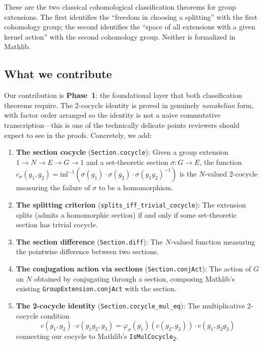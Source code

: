 \documentclass[11pt]{article}
\begin{document}
These are the two classical cohomological classification theorems for group
extensions. The first identifies the ``freedom in choosing a splitting'' with the
first cohomology group; the second identifies the ``space of all extensions with a
given kernel action'' with the second cohomology group. Neither is formalized in
Mathlib.

\subsection{What we contribute}

Our contribution is \textbf{Phase~1}: the foundational layer that both classification
theorems require. The 2-cocycle identity is proved in genuinely \emph{nonabelian} form, with
factor order arranged so the identity is not a naive commutative transcription---this is
one of the technically delicate points reviewers should expect to see in the proofs.
Concretely, we add:

\begin{enumerate}[nosep]
\item \textbf{The section cocycle} (\texttt{Section.cocycle}): Given a group extension
  $1 \to N \to E \to G \to 1$ and a set-theoretic section $\sigma : G \to E$, the
  function $c_\sigma(g_1, g_2) = \mathrm{inl}^{-1}(\sigma(g_1) \cdot \sigma(g_2)
  \cdot \sigma(g_1 g_2)^{-1})$ is the $N$-valued 2-cocycle measuring the failure of
  $\sigma$ to be a homomorphism.

\item \textbf{The splitting criterion} (\texttt{splits\_iff\_trivial\_cocycle}): The
  extension splits (admits a homomorphic section) if and only if some set-theoretic
  section has trivial cocycle.

\item \textbf{The section difference} (\texttt{Section.diff}): The $N$-valued function
  measuring the pointwise difference between two sections.

\item \textbf{The conjugation action via sections} (\texttt{Section.conjAct}): The
  action of $G$ on $N$ obtained by conjugating through a section, composing Mathlib's
  existing \texttt{GroupExtension.conjAct} with the section.

\item \textbf{The 2-cocycle identity} (\texttt{Section.cocycle\_mul\_eq}):
  The multiplicative 2-cocycle condition
  \[
    c(g_1, g_2) \cdot c(g_1 g_2, g_3) =
    \varphi_\sigma(g_1)(c(g_2, g_3)) \cdot c(g_1, g_2 g_3)
  \]
  connecting our cocycle to Mathlib's \texttt{IsMulCocycle\textsubscript{2}}.
\end{enumerate}
\end{document}
